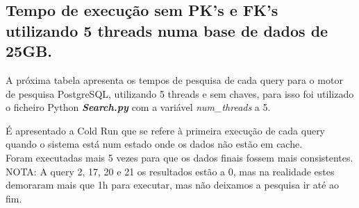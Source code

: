 \documentclass{article}
\begin{document}
\clearpage
\subsection{Tempo de execução sem PK's e FK's utilizando 5 threads numa base de dados de 25GB.}
\texttt{}\par A próxima tabela apresenta os tempos de pesquisa de cada query para o motor de pesquisa PostgreSQL, utilizando 5 threads e sem chaves, para isso foi utilizado o ficheiro Python \textbf{\textit{Search.py}}  com a variável \textit{num\_threads} a 5. 
\texttt{}\par É apresentado a Cold Run que se refere à primeira execução de cada query quando o sistema está num estado onde os dados não estão em cache.\\
Foram executadas mais 5 vezes para que os dados finais fossem mais consistentes.\\
NOTA: A query 2, 17, 20 e 21 os resultados estão a 0, mas na realidade estes demoraram mais que 1h para executar, mas não deixamos a pesquisa ir até ao fim.
\end{document}
